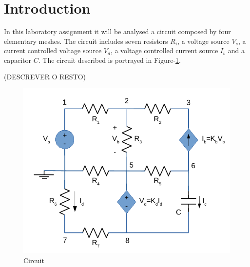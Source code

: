 \section{Introduction}
\label{sec:introduction}

In this laboratory assignment it will be analysed a circuit composed by four
elementary meshes. The circuit includes seven resistors $R_i$, a voltage source
$V_s$, a current controlled voltage source $V_d$, a voltage controlled current
source $I_b$ and a capacitor $C$. The circuit described is portrayed in
Figure-\ref{fig:circuit}.

(DESCREVER O RESTO)

\begin{figure}[H] \centering
\includegraphics[width=0.7\linewidth]{circuit.pdf}
\caption{Circuit}
\label{fig:circuit}
\end{figure}

\newpage
